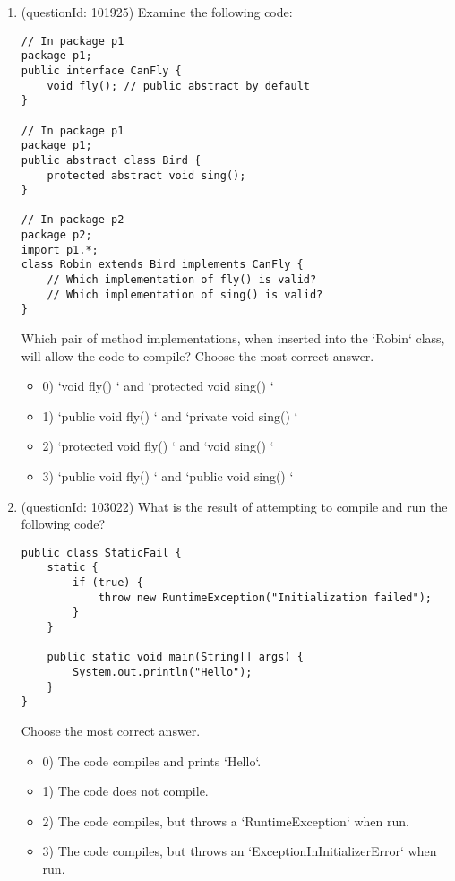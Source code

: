 \documentclass[12pt]{article}
\begin{document}
\begin{enumerate}[label=(\arabic*)]
\begin{itemize}
\end{itemize}
\item (questionId: 101925) Examine the following code:
\begin{verbatim}
// In package p1
package p1;
public interface CanFly {
    void fly(); // public abstract by default
}

// In package p1
package p1;
public abstract class Bird {
    protected abstract void sing();
}

// In package p2
package p2;
import p1.*;
class Robin extends Bird implements CanFly {
    // Which implementation of fly() is valid?
    // Which implementation of sing() is valid?
}
\end{verbatim}
Which pair of method implementations, when inserted into the `Robin` class, will allow the code to compile?
Choose the most correct answer. 
\begin{itemize}
\item 0) `void fly() {}` and `protected void sing() {}`

\item 1) `public void fly() {}` and `private void sing() {}`

\item 2) `protected void fly() {}` and `void sing() {}`

\item 3) `public void fly() {}` and `public void sing() {}`

\end{itemize}
\item (questionId: 103022) What is the result of attempting to compile and run the following code?
\begin{verbatim}
public class StaticFail {
    static {
        if (true) {
            throw new RuntimeException("Initialization failed");
        }
    }

    public static void main(String[] args) {
        System.out.println("Hello");
    }
}
\end{verbatim}
Choose the most correct answer. 
\begin{itemize}
\item 0) The code compiles and prints `Hello`.

\item 1) The code does not compile.

\item 2) The code compiles, but throws a `RuntimeException` when run.

\item 3) The code compiles, but throws an `ExceptionInInitializerError` when run.


\end{itemize}
\end{enumerate}
\end{document}
